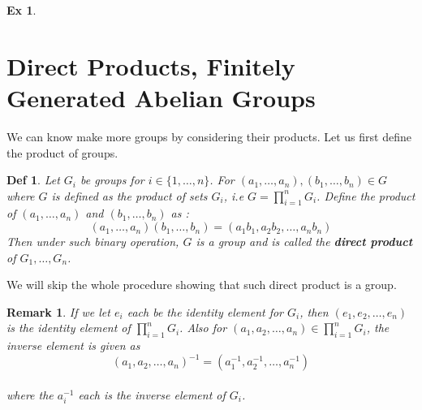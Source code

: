 \documentclass[paper=a4, fontsize=11pt]{scrartcl}
\newcommand{\Zn}[1]{\mathbb{Z}_{#1}}
\newcommand{\nextline}{$ $ \newline \vspace{-0.15in}}
\newtheorem{definition}{Def}
\newtheorem{example}{Ex}
\newtheorem*{remark}{Remark}
\begin{document}
\begin{example}
\nextline
{}
\end{example}

\vspace{0.25in}
\section{Direct Products, Finitely Generated Abelian Groups}
\vspace{0.25in}

We can know make more groups by considering their products. Let us first define the product of groups. \\

\begin{definition}
Let $G_i$ be groups for $i\in \{1,\dots,n\}$. For $(a_1,\dots,a_n),(b_1,\dots,b_n) \in G $ where $G$ is defined as the product of sets $G_i$, i.e $G=\prod\limits_{i=1}^n G_i$.  Define the product of $(a_1,\dots,a_n)$ and $(b_1,\dots,b_n)$ as :
\begin{equation}\nonumber
	(a_1,\dots,a_n)(b_1,\dots,b_n)= (a_1b_1, a_2b_2, \dots , a_nb_n)
\end{equation}
Then under such binary operation, $G$ is a group and is called the \textbf{direct product} of $G_1,\dots,G_n$.\\
\end{definition}

We will skip the whole procedure showing that such direct product is a group.\\

\begin{remark}
	If we let $e_i$ each be the identity element for $G_i$, then $(e_1,e_2,\dots,e_n)$ is the identity element of $\prod\limits_{i=1}^n G_i$. Also for $(a_1,a_2,\dots,a_n)\in \prod\limits_{i=1}^n G_i$, the inverse element is given as \\
	\begin{equation}\nonumber
		(a_1,a_2,\dots,a_n)^{-1} = (a_1^{-1},a_2^{-1},\dots,a_n^{-1})
	\end{equation}\\
	where the $a_i^{-1}$ each is the inverse element of $G_i$.\\
\end{remark}
\end{document}
